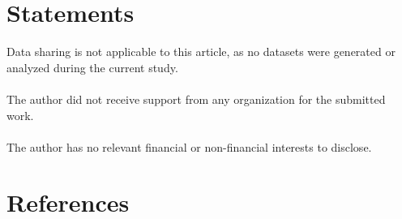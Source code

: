 \documentclass[aps,prx,preprint,groupedaddress,showkeys]{revtex4-2}
\begin{document}
\section{Statements} \label{4Chap}

Data sharing is not applicable to this article, as no datasets were generated or analyzed during the current study.\\
~\\
The author did not receive support from any organization for the submitted work.\\
~\\
The author has no relevant financial or non-financial interests to disclose.\\


\section*{References}


\end{document}
